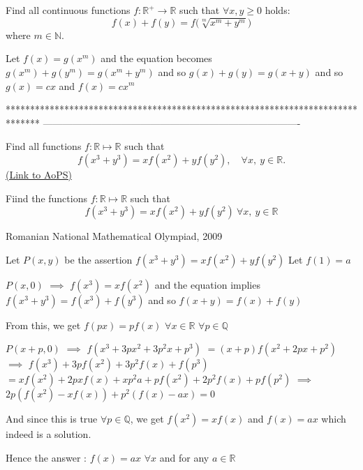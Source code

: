 \begin{solution}
	\begin{tcolorbox}Find all continuous functions $f:\mathbb{R}^{+} \to \mathbb{R}$ such that $\forall x,y \ge 0$ holds:
\[ f(x)+f(y)=f\Big( \sqrt[m]{x^m+y^m}\Big)\]
where $m \in \mathbb{N}$.\end{tcolorbox}
Let $f(x)=g(x^m)$ and the equation becomes $g(x^m)+g(y^m)=g(x^m+y^m)$ and so $g(x)+g(y)=g(x+y)$ and so $g(x)=cx$ and $\boxed{f(x)=cx^m}$
\end{solution}
*******************************************************************************
-------------------------------------------------------------------------------

\begin{problem}
	Find all functions $f : \mathbb{R} \longmapsto \mathbb{R}$ such that \[f(x^3+y^3)=xf(x^2)+yf(y^2), \quad \forall x,\ y\in\mathbb{R}.\]
	\flushright \href{https://artofproblemsolving.com/community/c6h393100}{(Link to AoPS)}
\end{problem}



\begin{solution}
	\begin{tcolorbox}Fiind the functions $f : \mathbb{R} \longmapsto \mathbb{R}$  such that \[f(x^3+y^3)=xf(x^2)+yf(y^2)\ \forall x,\ y\in\mathbb{R}\]

Romanian National Mathematical Olympiad, 2009\end{tcolorbox}
Let $P(x,y)$ be the assertion $f(x^3+y^3)=xf(x^2)+yf(y^2)$
Let $f(1)=a$

$P(x,0)$ $\implies$ $f(x^3)=xf(x^2)$ and the equation implies $f(x^3+y^3)=f(x^3)+f(y^3)$ and so $f(x+y)=f(x)+f(y)$

From this, we get $f(px)=pf(x)$ $\forall x\in\mathbb R$ $\forall p\in\mathbb Q$

$P(x+p,0)$ $\implies$ $f(x^3+3px^2+3p^2x+p^3)$ $=(x+p)f(x^2+2px+p^2)$
$\implies$ $f(x^3)+3pf(x^2)+3p^2f(x)+f(p^3)$ $=xf(x^2)+2pxf(x)+xp^2a+pf(x^2)+2p^2f(x)+pf(p^2)$
$\implies$ $2p(f(x^2)-xf(x))+p^2(f(x)-ax)=0$

And since this is true $\forall p\in\mathbb Q$, we get $f(x^2)=xf(x)$ and $f(x)=ax$ which indeed is a solution.

Hence the answer : $\boxed{f(x)=ax}$ $\forall x$ and for any $a\in\mathbb R$
\end{solution}



